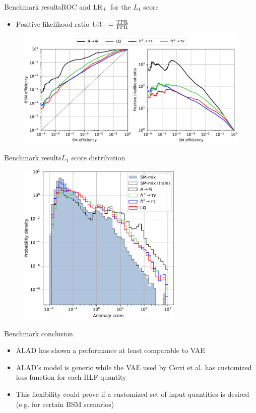 \documentclass{beamer}
\begin{document}
\begin{frame}{Benchmark results}{ROC and $\textup{LR}_+$ for the $L_1$ score}
  \begin{itemize}
      \item<1-> Positive likelihood ratio $\textup{LR}_+ = \frac{\textup{TPR}}{\textup{FPR}}$
  \end{itemize}
\begin{figure}[!htb]
\centering
\includegraphics[width=1\textwidth]{roc_lrp.pdf}
\end{figure}
\end{frame}

\begin{frame}{Benchmark results}{$L_1$ score distribution}
\begin{figure}[!htb]
\centering
\includegraphics[width=0.7\textwidth]{score_dist.pdf}
\end{figure}
\end{frame}

\begin{frame}{Benchmark conclusion}
  \begin{itemize}
      \item<1-> ALAD has shown a performance at least comparable to VAE 
      \item<2-> ALAD's model is generic while the VAE used by Cerri et al. has customized loss function for each HLF quantity
      \item<3-> This flexibility could prove if a customized set of input quantities is desired (e.g. for certain BSM scenarios)
  \end{itemize}
\end{frame}
\end{document}
